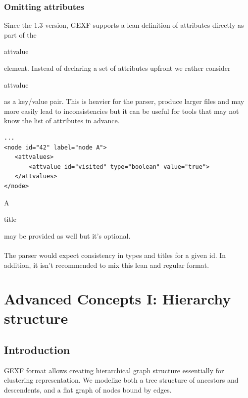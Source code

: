 \documentclass[a4paper,10pt]{article}
\begin{document}
\subsubsection{Omitting attributes}

Since the 1.3 version, GEXF supports a lean definition of attributes directly as part of the \begin{footnotesize}attvalue\end{footnotesize} element. Instead of declaring a set of attributes upfront we rather consider \begin{footnotesize}attvalue\end{footnotesize} as a key/value pair. This is heavier for the parser, produce larger files and may more easily lead to inconsistencies but it can be useful for tools that may not know the list of attributes in advance.

\lstset{ style=gexf }
\begin{lstlisting}[caption={Attribute definition in attvalue },label=attvalueidtype]
...
<node id="42" label="node A">
   <attvalues>
       <attvalue id="visited" type="boolean" value="true">
   </attvalues>
</node>
\end{lstlisting}

A \begin{footnotesize}title\end{footnotesize} may be provided as well but it's optional.

\paragraph{}
The parser would expect consistency in types and titles for a given id. In addition, it isn't recommended to mix this lean and regular format.

\section{Advanced Concepts I: Hierarchy structure} \label{hierarchy}

\subsection{Introduction}

GEXF format allows creating hierarchical graph structure essentially for clustering representation. We modelize both a tree structure of ancestors and descendents, and a flat graph of nodes bound by edges.
\end{document}

